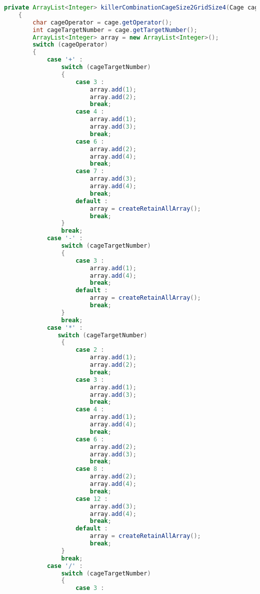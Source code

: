 \begin{lstlisting}[language=Java,basicstyle=\tiny,caption=SolverRuleBased.java]
    private ArrayList<Integer> killerCombinationCageSize2GridSize4(Cage cage)
    {
        char cageOperator = cage.getOperator();
        int cageTargetNumber = cage.getTargetNumber();
        ArrayList<Integer> array = new ArrayList<Integer>();
        switch (cageOperator)
        {
            case '+' :
                switch (cageTargetNumber)
                {
                    case 3 :
                        array.add(1);
                        array.add(2);
                        break;
                    case 4 :  
                        array.add(1);
                        array.add(3);
                        break;
                    case 6 :
                        array.add(2);
                        array.add(4);
                        break;
                    case 7 :
                        array.add(3);
                        array.add(4);
                        break;
                    default :
                        array = createRetainAllArray();
                        break;
                }
                break;
            case '-' :
                switch (cageTargetNumber)
                {
                    case 3 :
                        array.add(1);
                        array.add(4);
                        break;
                    default :
                        array = createRetainAllArray();
                        break;
                }
                break;
            case '*' :
               switch (cageTargetNumber)
                {
                    case 2 :
                        array.add(1);
                        array.add(2);
                        break;
                    case 3 :
                        array.add(1);
                        array.add(3);
                        break;
                    case 4 :
                        array.add(1);
                        array.add(4);
                        break;
                    case 6 :
                        array.add(2);
                        array.add(3);
                        break;
                    case 8 :
                        array.add(2);
                        array.add(4);
                        break;
                    case 12 :
                        array.add(3);
                        array.add(4);
                        break;
                    default :
                        array = createRetainAllArray();
                        break;
                }
                break;
            case '/' :
                switch (cageTargetNumber)
                {
                    case 3 :

\end{lstlisting}
